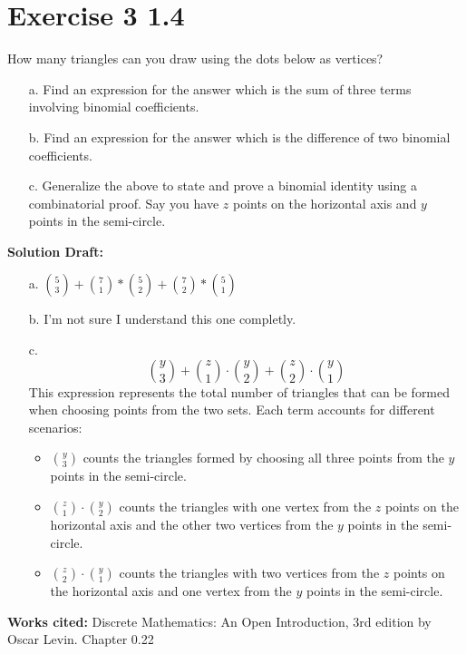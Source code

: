 \documentclass{article}
\begin{document}
\section*{Exercise 3 1.4}  

How many triangles can you draw using the dots below as vertices?
\begin{enumerate}
    \item[a.] Find an expression for the answer which is the sum of three terms involving binomial coefficients.
    \item[b.] Find an expression for the answer which is the difference of two binomial coefficients.
    \item[c.] Generalize the above to state and prove a binomial identity using a combinatorial proof. Say you have \( z \) points on the horizontal axis and \( y \) points in the semi-circle.
\end{enumerate}


\vspace{0.5cm}
\noindent\textbf{Solution Draft:} 
\vspace{0.2cm}

\begin{enumerate}
    \item[a.] $\binom{5}{3}+\binom{7}{1}*\binom{5}{2}+\binom{7}{2}*\binom{5}{1}$
    \item[b.] I'm not sure I understand this one completly.
    \item[c.] 
    \[
        \binom{y}{3} + \binom{z}{1} \cdot \binom{y}{2} + \binom{z}{2} \cdot \binom{y}{1}
    \]
    This expression represents the total number of triangles that can be formed when choosing points from the two sets. Each term accounts for different scenarios:
\begin{itemize}
    \item \( \binom{y}{3} \) counts the triangles formed by choosing all three points from the \( y \) points in the semi-circle.
    \item \( \binom{z}{1} \cdot \binom{y}{2} \) counts the triangles with one vertex from the \( z \) points on the horizontal axis and the other two vertices from the \( y \) points in the semi-circle.
    \item \( \binom{z}{2} \cdot \binom{y}{1} \) counts the triangles with two vertices from the \( z \) points on the horizontal axis and one vertex from the \( y \) points in the semi-circle.
\end{itemize}

\end{enumerate}
\vspace{0.5cm}
\textbf{Works cited:}
Discrete Mathematics: An Open Introduction, 3rd edition by Oscar Levin. Chapter 0.22
\end{document}
